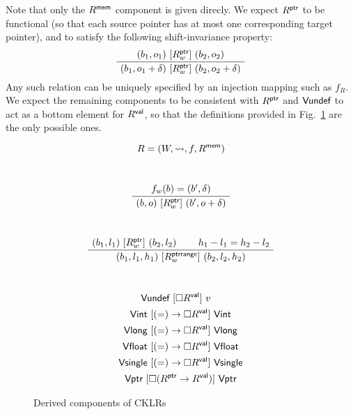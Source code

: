 Note that only the $R^{ \textsf{mem} }$ component is given direcly.
We expect $R^{ \textsf{ptr} }$ to be functional
(so that each source pointer has at most one corresponding target pointer),
and to satisfy the following shift-invariance property:
\[
  \AxiomC{$(b_1, o_1) \ifr{R^\kw{ptr}_w} (b_2, o_2)$}
  \UnaryInfC{$(b_1, o_1 + \delta) \ifr{R^\kw{ptr}_w} (b_2, o_2 + \delta)$}
  \DisplayProof
\]
Any such relation can be uniquely specified by
an injection mapping such as $f_R$.
We expect the remaining components to be consistent with $R^{ \textsf{ptr} }$
and $ \textsf{Vundef} $ to act as a bottom element for $R^{ \textsf{val} }$,
so that the definitions provided in Fig.~\ref{fig:cklr-derived}
are the only possible ones.

\begin{figure}[p] %
  \[ R = (W, \leadsto, f, R^{ \textsf{mem} }) \]

  \noindent {} \hfill \ 
  \[
    \AxiomC{$f_w(b) = (b', \delta)$}
    \UnaryInfC{$(b, o) \ifr{R_w^\kw{ptr}} (b', o + \delta)$}
    \DisplayProof
  \]

  \noindent {} \hfill \ 
  \[
    \AxiomC{$(b_1, l_1) \ifr{R^\kw{ptr}_w} (b_2, l_2)$}
    \AxiomC{$h_1 - l_1 = h_2 - l_2$}
    \BinaryInfC{$(b_1, l_1, h_1) \ifr{R^\kw{ptrrange}_w} (b_2, l_2, h_2)$}
    \DisplayProof
  \]

  \noindent {} \hfill \ 
  \begin{gather*}
     \textsf{Vundef}  \ [{\Box R^{ \textsf{val} }}]\  v \quad \\
     \textsf{Vint}  \ [{(=) \rightarrow \Box R^{ \textsf{val} }}]\   \textsf{Vint}  \\
     \textsf{Vlong}  \ [{(=) \rightarrow \Box R^{ \textsf{val} }}]\   \textsf{Vlong}  \\
     \textsf{Vfloat}  \ [{(=) \rightarrow \Box R^{ \textsf{val} }}]\   \textsf{Vfloat}  \\
     \textsf{Vsingle}  \ [{(=) \rightarrow \Box R^{ \textsf{val} }}]\   \textsf{Vsingle}  \\
     \textsf{Vptr}  \ [{\Box (R^{ \textsf{ptr} } \rightarrow R^{ \textsf{val} })}]\   \textsf{Vptr} 
  \end{gather*}

  \caption{Derived components of CKLRs}
  \label{fig:cklr-derived}
\end{figure}

